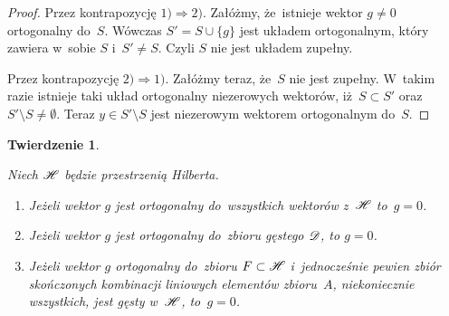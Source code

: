 \documentclass[a4paper,11pt]{article}
\numberwithin{equation}{section}
\newtheorem{theorem}{Twierdzenie}
\begin{document}
\begin{proof}

  Przez kontrapozycję $1) \Rightarrow 2)$. Załóżmy, że~istnieje wektor
  $g \neq 0$ ortogonalny do~$S$. Wówczas $S' = S \cup \{ g \}$ jest
  układem ortogonalnym, który zawiera w~sobie $S$ i~$S' \neq S$. Czyli
  $S$ nie jest układem zupełny.

  Przez kontrapozycję $2) \Rightarrow 1)$. Załóżmy teraz, że~$S$ nie jest
  zupełny. W~takim razie istnieje taki układ ortogonalny niezerowych
  wektorów, iż~$S \subset S'$ oraz $S' \setminus S \neq \emptyset$. Teraz
  $y \in S' \setminus S$ jest niezerowym wektorem ortogonalnym do~$S$.

\end{proof}





\begin{theorem}
  \label{thm:OrotgonalnoscDoZbioruGestegoIBazy}

  Niech $\mathcal{H}$ będzie przestrzenią Hilberta.
  \begin{enumerate}
  \item Jeżeli wektor $g$ jest ortogonalny do~wszystkich wektorów
    z~$\mathcal{H}$ to~$g = 0$.

  \item Jeżeli wektor $g$ jest ortogonalny do~zbioru gęstego $\mathcal{D}$, to
    $g = 0$.

  \item Jeżeli wektor $g$ ortogonalny do~zbioru $F \subset \mathcal{H}$
    i~jednocześnie pewien zbiór skończonych kombinacji liniowych
    elementów zbioru~$A$, niekoniecznie wszystkich, jest gęsty
    w~$\mathcal{H}$, to~$g = 0$.

  \end{enumerate}

\end{theorem}
\end{document}
